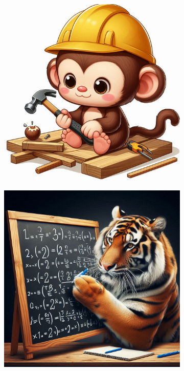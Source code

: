 \begin{figure}[H] %
    \centering
    \begin{subfigure}[b]{0.48\textwidth}
        \centering
        \includegraphics[width = \textwidth]{imagenes/test1.jpeg}
        \caption{}
        \label{subfig:test4}
    \end{subfigure}
    \hfill
    \begin{subfigure}[b]{0.49\textwidth}
        \centering
        \includegraphics[width = \textwidth]{imagenes/test2.jpeg}

\end{subfigure}
\end{figure}
